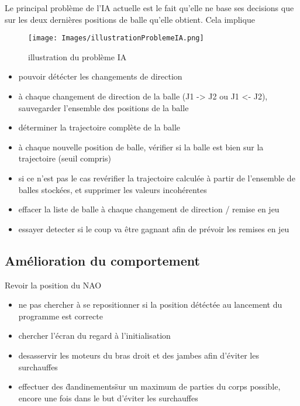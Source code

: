     \par Le principal problème de l'IA actuelle est le fait qu'elle ne base ses decisions que sur les deux dernières positions de balle qu'elle obtient. Cela implique
    \begin{figure}[!h]
      \caption{illustration du problème IA}
      \centering
      \texttt{[image: Images/illustrationProblemeIA.png]}
    \end{figure}
          \begin{itemize}
            \item pouvoir détécter les changements de direction
            \item à chaque changement de direction de la balle (J1 -> J2 ou J1 <- J2), sauvegarder l'ensemble des positions de la balle
            \item déterminer la trajectoire complète de la balle
            \item à chaque nouvelle position de balle, vérifier si la balle est bien sur la trajectoire (seuil compris)
            \item si ce n'est pas le cas revérifier la trajectoire calculée à partir de l'ensemble de balles stockées, et supprimer les valeurs incohérentes
            \item effacer la liste de balle à chaque changement de direction / remise en jeu
            \item essayer detecter si le coup va être gagnant afin de prévoir les remises en jeu
          \end{itemize}


  \subsection{Amélioration du comportement}
  \label{sub:Amélioration du comportement}
  \par Revoir la position du NAO
        \begin{itemize}
          \item ne pas chercher à se repositionner si la position détéctée au lancement du programme est correcte
          \item chercher l'écran du regard à l'initialisation
          \item desasservir les moteurs du bras droit et des jambes afin d'éviter les surchauffes
          \item effectuer des \"dandinements\" sur un maximum de parties du corps possible, encore une fois dans le but d'éviter les surchauffes
        \end{itemize}

